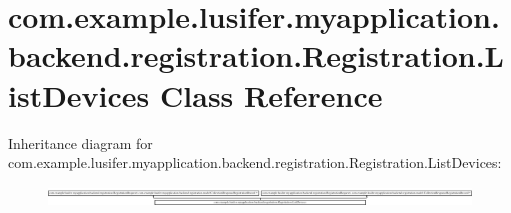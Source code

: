 \hypertarget{classcom_1_1example_1_1lusifer_1_1myapplication_1_1backend_1_1registration_1_1_registration_1_1_list_devices}{}\section{com.\+example.\+lusifer.\+myapplication.\+backend.\+registration.\+Registration.\+List\+Devices Class Reference}
\label{classcom_1_1example_1_1lusifer_1_1myapplication_1_1backend_1_1registration_1_1_registration_1_1_list_devices}
Inheritance diagram for com.\+example.\+lusifer.\+myapplication.\+backend.\+registration.\+Registration.\+List\+Devices\+:\begin{figure}[H]
\begin{center}
\leavevmode
\includegraphics[height=0.537944cm]{classcom_1_1example_1_1lusifer_1_1myapplication_1_1backend_1_1registration_1_1_registration_1_1_list_devices}
\end{center}
\end{figure}
